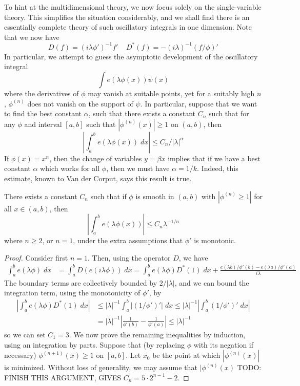 To hint at the multidimensional theory, we now focus solely on the single-variable theory. This simplifies the situation considerably, and we shall find there is an essentially complete theory of such oscillatory integrals in one dimension. Note that we now have
%
\[ D(f) = (i\lambda \phi')^{-1} f'\ \ \ \ \ D^*(f) = -(i \lambda)^{-1} (f/\phi)' \]
%
In particular, we attempt to guess the asymptotic development of the oscillatory integral
%
\[ \int e(\lambda \phi(x)) \psi(x) \]
%
where the derivatives of $\phi$ may vanish at suitable points, yet for a suitably high $n$, $\phi^{(n)}$ does not vanish on the support of $\psi$. In particular, suppose that we want to find the best constant $\alpha$, such that there exists a constant $C_n$ such that for any $\phi$ and interval $[a,b]$ such that $|\phi^{(n)}(x)| \geq 1$ on $(a,b)$, then
%
\[ \left| \int_a^b e(\lambda \phi(x))\; dx \right| \leq C_n/|\lambda|^\alpha \]
%
If $\phi(x) = x^n$, then the change of variables $y = \beta x$ implies that if we have a best constant $\alpha$ which works for all $\phi$, then we must have $\alpha = 1/k$. Indeed, this estimate, known to Van der Corput, says this result is true.

\begin{theorem}
	There exists a constant $C_n$ such that if $\phi$ is smooth in $(a,b)$ with $|\phi^{(n)} \geq 1|$ for all $x \in (a,b)$, then
	\[ \left| \int_a^b e(\lambda \phi(x)) \right| \leq C_n \lambda^{-1/n} \]
	where $n \geq 2$, or $n = 1$, under the extra assumptions that $\phi'$ is monotonic.
\end{theorem}
\begin{proof}
	Consider first $n = 1$. Then, using the operator $D$, we have
	\begin{align*}
		\int_a^b e(\lambda \phi)\; dx &= \int_a^b D(e(i \lambda \phi))\; dx = \int_a^b e(\lambda \phi) D^*(1)\; dx + \frac{e(\lambda b)/\phi'(b) - e(\lambda a)/\phi'(a)}{i \lambda}
	\end{align*}
	The boundary terms are collectively bounded by $2/|\lambda|$, and we can bound the integration term, using the monotonicity of $\phi'$, by
	\begin{align*}
		\left| \int_a^b e(\lambda \phi) D^*(1)\; dx \right| &\leq |\lambda|^{-1} \int_a^b |(1/\phi')'|\; dx \leq |\lambda|^{-1} \left| \int_a^b (1/\phi')'\; dx \right|\\
		&= |\lambda|^{-1} \left| \frac{1}{\phi'(b)} - \frac{1}{\phi'(a)} \right| \leq |\lambda|^{-1}
	\end{align*}
	so we can set $C_1 = 3$. We now prove the remaining inequalities by induction, using an integration by parts. Suppose that (by replacing $\phi$ with its negation if necessary) $\phi^{(n+1)}(x) \geq 1$ on $[a,b]$. Let $x_0$ be the point at which $|\phi^{(n)}(x)|$ is minimized. Without loss of generality, we may assume that $|\phi^{(n)}(x)$ TODO: FINISH THIS ARGUMENT, GIVES $C_n = 5 \cdot 2^{n-1} - 2$.
\end{proof}

